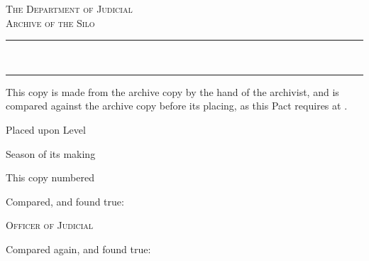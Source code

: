 %

\cleardoublepage
\begin{center}


{\footnotesize\scshape The Department of Judicial}\\[2pt]
{\footnotesize\scshape Archive of the Silo}

\vspace{10pt}
\rule{3in}{0.4pt}\\[-7pt]
\rule{3in}{0.4pt}

\vspace{18pt}

\begin{minipage}{3.5in}
\footnotesize
\setlength{\parindent}{0pt}
This copy is made from the archive copy by the hand of the archivist, and is
compared against the archive copy before its placing, as this Pact requires at
.

\vspace{16pt}
Placed upon Level \fillrule{1.4in}

\vspace{10pt}
Season of its making \fillrule{1.1in}

\vspace{10pt}
This copy numbered \fillrule{1.25in}

\vspace{18pt}
Compared, and found true:

\vspace{10pt}
\fillrule{1.6in}\hfill{\scriptsize\scshape Officer of Judicial}

\vspace{16pt}
Compared again, and found true:

\vspace{10pt}
\fillrule{1.05in}\hfill\fillrule{1.05in}\hfill\fillrule{1.05in}

\vspace{14pt}
\fillrule{1.05in}\hfill\fillrule{1.05in}\hfill\fillrule{1.05in}

\vspace{14pt}
\fillrule{1.05in}\hfill\fillrule{1.05in}\hfill\fillrule{1.05in}
\end{minipage}


\end{center}
